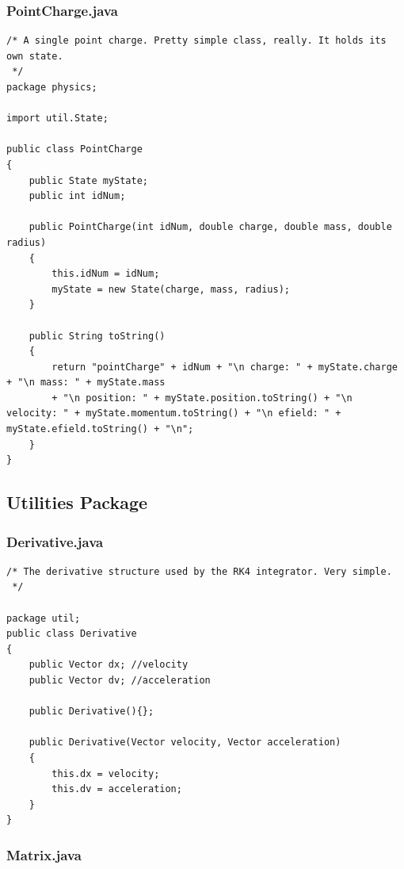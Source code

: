 \documentclass[10pt]{article}
\begin{document}
\subsubsection{PointCharge.java}
\begin{verbatim}
/* A single point charge. Pretty simple class, really. It holds its own state.
 */
package physics;

import util.State;

public class PointCharge 
{
	public State myState;
	public int idNum;
	
	public PointCharge(int idNum, double charge, double mass, double radius)
	{
		this.idNum = idNum;
		myState = new State(charge, mass, radius);
	}
	
	public String toString()
	{
		return "pointCharge" + idNum + "\n charge: " + myState.charge + "\n mass: " + myState.mass 
		+ "\n position: " + myState.position.toString() + "\n velocity: " + myState.momentum.toString() + "\n efield: " + myState.efield.toString() + "\n";
	}
}

\end{verbatim}

\subsection{Utilities Package}
\subsubsection{Derivative.java}
\begin{verbatim}
/* The derivative structure used by the RK4 integrator. Very simple.
 */

package util;
public class Derivative
{
	public Vector dx; //velocity
	public Vector dv; //acceleration
	
	public Derivative(){};
	
	public Derivative(Vector velocity, Vector acceleration)
	{
		this.dx = velocity;
		this.dv = acceleration;
	}
}
\end{verbatim}

\subsubsection{Matrix.java}
\end{document}
